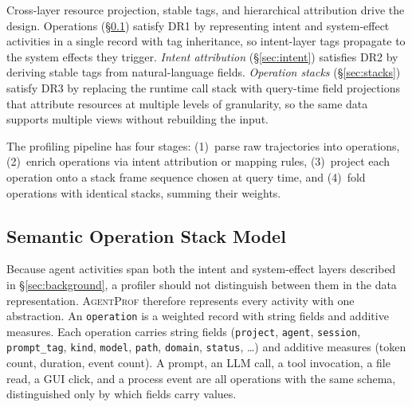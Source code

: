 \documentclass[letterpaper]{article}
\newcommand{\sys}{\textsc{AgentProf}\xspace}
\newcommand{\operation}{\texttt{operation}\xspace}
\begin{document}
Cross-layer resource projection, stable tags, and hierarchical attribution
drive the design.
Operations (\S\ref{sec:ops}) satisfy DR1 by representing intent and system-effect activities in a single record with tag inheritance, so intent-layer tags propagate to the system effects they trigger.
\emph{Intent attribution} (\S\ref{sec:intent}) satisfies DR2 by deriving stable tags from natural-language fields.
\emph{Operation stacks} (\S\ref{sec:stacks}) satisfy DR3 by replacing the runtime call stack with query-time field projections that attribute resources at multiple levels of granularity, so the same data supports multiple views without rebuilding the input.

The profiling pipeline has four stages: (1)~parse raw trajectories into operations, (2)~enrich operations via intent attribution or mapping rules, (3)~project each operation onto a stack frame sequence chosen at query time, and (4)~fold operations with identical stacks, summing their weights.

\subsection{Semantic Operation Stack Model}
\label{sec:ops}

Because agent activities span both the intent and system-effect
layers described in \S\ref{sec:background}, a profiler should not
distinguish between them in the data representation.
\sys therefore represents every activity with one abstraction. An
\operation is a weighted record with string fields and additive measures.
Each operation carries string fields (\texttt{project},
\texttt{agent}, \texttt{session}, \texttt{prompt\_tag},
\texttt{kind}, \texttt{model}, \texttt{path}, \texttt{domain},
\texttt{status}, \ldots) and additive measures (token count,
duration, event count).
A prompt, an LLM call, a tool invocation, a file read, a GUI click,
and a process event are all operations with the same schema, distinguished only by which fields carry values.
\end{document}
